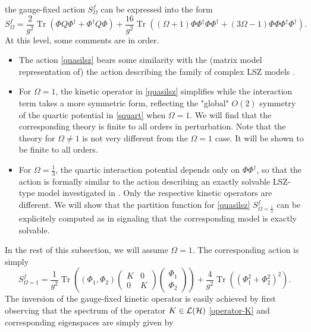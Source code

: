 \documentclass[a4paper,11pt,twoside]{article}
\numberwithin{equation}{section}
\DeclareMathOperator{\tr}{Tr}
\theoremstyle{nonumberplain}
\newcounter{and}
\begin{document}
%
the gauge-fixed action $S^f_\Omega$ can be expressed into the form%
%
\begin{equation}
S^f_\Omega = \frac{2}{g^2} \tr\left( \Phi Q \Phi^\dag + \Phi^\dag Q\Phi \right) + \frac{16}{g^2} \tr\left( (\Omega+1) \Phi\Phi^\dag\Phi\Phi^\dag + (3\Omega-1) \Phi\Phi\Phi^\dag\Phi^\dag \right) .
\label{quasilsz}
\end{equation}
%
At this level, some comments are in order.
\begin{itemize}
%
\item The action \eqref{quasilsz} bears some similarity with the (matrix model representation of) the action describing the family of complex LSZ models \cite{LSZ}.%
%
\item For $\Omega=1$, the kinetic operator in \eqref{quasilsz} simplifies while the interaction term takes a more symmetric form, reflecting the "global" $O(2)$ symmetry of the quartic potential in \eqref{squart} when $\Omega=1$. We will find that the corresponding theory is finite to all orders in perturbation. Note that the theory for $\Omega\ne 1$ is not very different from the $\Omega=1$ case. It will be shown to be finite to all orders.%
%
\item For $\Omega=\frac{1}{3}$, the quartic interaction potential depends only on $\Phi\Phi^\dag$, so that the action is formally similar to the action describing an exactly solvable LSZ-type model investigated in \cite{LSZ}. Only the respective kinetic operators are different. We will show that the partition function for \eqref{quasilsz} $S^f_{\Omega=\frac{1}{3}}$ can be explicitely computed as in \cite{LSZ} signaling that the corresponding model is exactly solvable.%
%
\end{itemize}
%
In the rest of this subsection, we will assume $\Omega=1$. The corresponding action is simply%
%
\begin{equation}
S^f_{\Omega=1} = \frac{1}{g^2} \tr\left( (\Phi_1,\Phi_2)
\begin{pmatrix}
K&0\\
0&K
\end{pmatrix} 
\begin{pmatrix}
\Phi_1\\
\Phi_2
\end{pmatrix} 
\right)
+ \frac{4}{g^2} \tr\left( (\Phi_1^2 + \Phi_2^2)^2 \right) . \label{critical-action}
\end{equation}
%
The inversion of the gauge-fixed kinetic operator is easily achieved by first observing that the spectrum of the operator $K\in{\cal{L}}({\cal{H}})$ \eqref{operator-K} and corresponding eigenspaces are simply given by%
\end{document}
